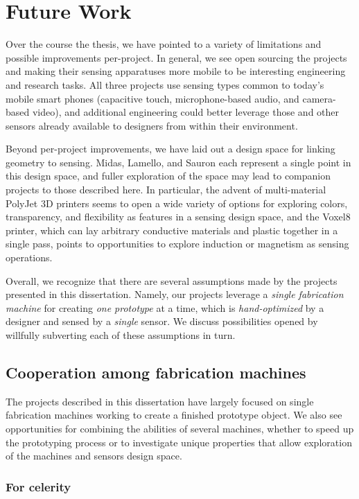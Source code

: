\section{Future Work}

Over the course the thesis, we have pointed to a variety of limitations and possible improvements per-project. In general, we see open sourcing the projects and making their sensing apparatuses more mobile to be interesting engineering and research tasks. All three projects use sensing types common to today's mobile smart phones (capacitive touch, microphone-based audio, and camera-based video), and additional engineering could better leverage those and other sensors already available to designers from within their environment.

Beyond per-project improvements, we have laid out a design space for linking geometry to sensing. Midas, Lamello, and Sauron each represent a single point in this design space, and fuller exploration of the space may lead to companion projects to those described here. In particular, the advent of multi-material PolyJet 3D printers seems to open a wide variety of options for exploring colors, transparency, and flexibility as features in a sensing design space, and the Voxel8 \cite{voxel8} printer, which can lay arbitrary conductive materials and plastic together in a single pass, points to opportunities to explore induction or magnetism as sensing operations.

Overall, we recognize that there are several assumptions made by the projects presented in this dissertation. Namely, our projects leverage a \emph{single fabrication machine} for creating \emph{one prototype} at a time, which is \emph{hand-optimized} by a designer and sensed by a \emph{single} sensor. We discuss possibilities opened by willfully subverting each of these assumptions in turn.

\subsection{Cooperation among fabrication machines}

The projects described in this dissertation have largely focused on single fabrication machines working to create a finished prototype object. We also see opportunities for combining the abilities of several machines, whether to speed up the prototyping process or to investigate unique properties that allow exploration of the machines and sensors design space.

    \subsubsection{For celerity}

